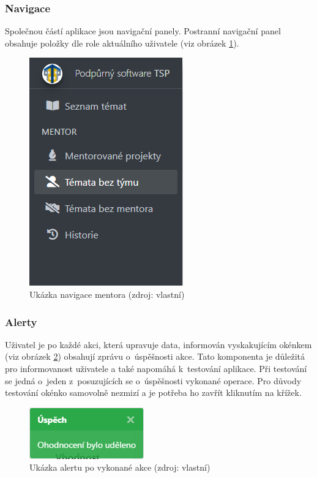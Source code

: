 \documentclass[czech,BP]{thesiskiv}
\begin{document}
	\subsubsection{Navigace}
	\par Společnou částí aplikace jsou navigační panely. Postranní navigační panel obsahuje položky dle role aktuálního uživatele (viz obrázek \ref{fig:example_nav}).
	 \begin{figure}[H]
	 	\centering
	 	\includegraphics{img/ukazky/navigace}
	 	\caption{Ukázka navigace mentora (zdroj: vlastní)}
	 	\label{fig:example_nav}
	 \end{figure}
 	\subsubsection{Alerty}
 	\par Uživatel je po každé akci, která upravuje data, informován vyskakujícím okénkem (viz obrázek \ref{fig:example_alert}) obsahují zprávu o~úspěšnosti akce. Tato komponenta je důležitá pro informovanost uživatele a také napomáhá k~testování aplikace. Při testování se jedná o~jeden z~posuzujících se o~úspěšnosti vykonané operace. Pro důvody testování okénko samovolně nezmizí a je potřeba ho zavřít kliknutím na křížek.
 	\begin{figure}[H]
 		\centering
 		\includegraphics{img/ukazky/alert}
 		\caption{Ukázka alertu po vykonané akce (zdroj: vlastní)}
 		\label{fig:example_alert}
 	\end{figure}
\end{document}
